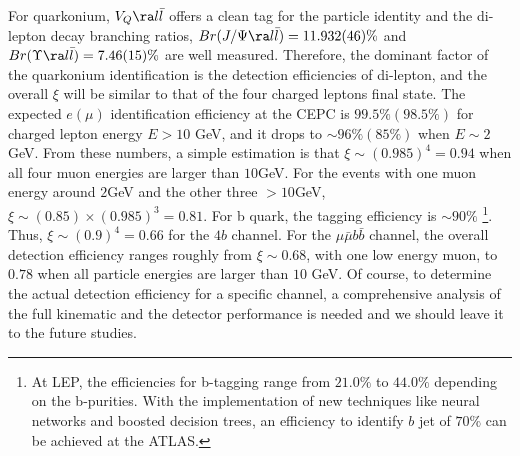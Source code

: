 \documentclass[11pt]{article}
\begin{document}
For quarkonium, $V_Q\ra l\bar{l}$ offers a clean tag for the particle identity and the di-lepton decay branching ratios, $Br(J/\Psi\ra l\bar{l})=11.932(46)\%$ and $Br(\Upsilon\ra l\bar{l})=7.46(15)\%$\cite{Patrignani:2016xqp} are well measured.
Therefore, the dominant factor of the quarkonium identification is the detection efficiencies of di-lepton, and the overall $\xi$ will be similar to
that of the four charged leptons final state.
The expected $e(\mu)$ identification efficiency at the CEPC is $99.5\%(98.5\%)$ for charged lepton energy $E>10$ GeV, and it
drops to $\sim 96\%(85\%)$ when $E\sim 2$GeV\cite{CEPC-SPPCStudyGroup:2015csa}. From these numbers, a simple estimation is that $\xi\sim (0.985)^4=0.94$ when all four muon energies are larger than $10$GeV. For the events with one muon energy around $2$GeV and the other three $>10$GeV, $\xi\sim(0.85)\times(0.985)^3=0.81$.
For b quark, the tagging efficiency is $\sim 90\%$ \cite{CEPC-SPPCStudyGroup:2015csa}\footnote{ At LEP, the efficiencies for b-tagging range from $21.0\%$ to $44.0\%$ depending on the b-purities\cite{Abdallah:2002xm}. With the implementation of new techniques like neural networks and boosted decision trees, an efficiency to identify $b$ jet of $70\%$ can be achieved at the ATLAS\cite{Aad:2015ydr}.  }.
Thus, $\xi\sim (0.9)^4= 0.66$ for the $4b$ channel. For the $\mu\bar{\mu} b\bar{b}$ channel, the overall detection efficiency
ranges roughly from $\xi\sim 0.68$, with one low energy muon, to $0.78$ when all particle energies are larger than $10$ GeV.
Of course, to determine the actual detection efficiency for a specific channel, a comprehensive analysis of the full kinematic and the detector performance is needed and we should leave it to the future studies.
\end{document}
